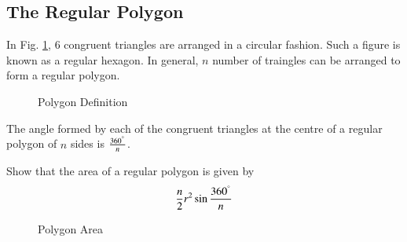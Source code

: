 \subsection{The Regular Polygon}
%

\begin{definition}
	In Fig. \ref{ch5_polygon_def}, 6 congruent triangles are arranged in a circular fashion.  Such a figure is known as a regular hexagon.  In general, $n$ number of traingles can be arranged to form a regular polygon.
\end{definition}
\begin{figure}[!h]
	\begin{center}
		
		\resizebox{\columnwidth}{!}{}
	\end{center}
	\caption{Polygon Definition}
	\label{ch5_polygon_def}	
\end{figure}
%
\begin{definition}
The angle formed by each of the congruent triangles at the centre of a regular polygon of $n$ sides is $\frac{360^{\degree}}{n}$.
\end{definition}
%
\begin{problem}
Show that the area of a regular polygon is given by 
%
\begin{equation}
\frac{n}{2}r^{2}\sin\frac{360^{\degree}}{n}
\end{equation}
%
\end{problem}
\begin{figure}[!h]
	\begin{center}
		
		\resizebox{\columnwidth}{!}{}
	\end{center}
	\caption{Polygon Area}
	\label{ch5_polygon_area}	
\end{figure}
%

